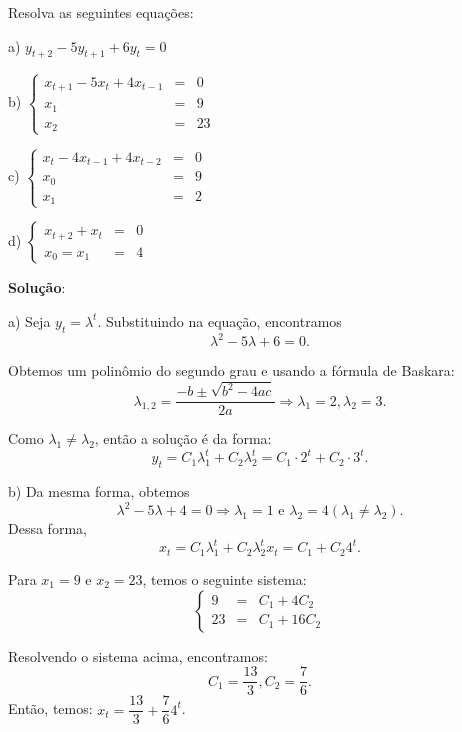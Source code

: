 \begin{exercise}
Resolva as seguintes equações: 

\begin{description}
\item a) $y_{t+2} - 5y_{t+1} + 6y_{t} = 0$
\item b)
$\left\{\begin{array}{rcl}
x_{t+1} - 5x_{t} + 4x_{t-1} &=& 0 \\
x_1 &=& 9 \\
x_2 &=& 23
\end{array}\right.$
\item c)
$\left\{\begin{array}{rcl}
x_{t} - 4x_{t-1} + 4x_{t-2} &=& 0 \\
x_0 &=& 9 \\
x_1 &=& 2 
\end{array}\right.$
\item d) 
$\left\{\begin{array}{rcl}
x_{t+2} + x_{t} &=& 0 \\
x_0 = x_1 &=& 4
\end{array}\right.$

\end{description}
\end{exercise}



\textbf{Solução}:

a) Seja $y_{t} = \lambda^{t}$. Substituindo na equação, encontramos
$$\lambda^{2}-5\lambda +6=0.$$

Obtemos um polinômio do segundo grau e usando a fórmula de Baskara: 
$$\lambda_{1,2} = \dfrac{-b \pm \sqrt{b^2-4ac}}{2a} \Rightarrow \lambda_{1} = 2, \lambda_{2} = 3.$$

Como $\lambda_{1} \ne \lambda_{2}$, então a solução é da forma:
$$y_{t} = C_1\lambda_{1}^{t} + C_2\lambda_{2}^{t} = C_1 \cdot 2^{t} + C_2 \cdot 3^{t}.$$

b) Da mesma forma, obtemos
$$\lambda^{2} - 5\lambda +4=0 \Rightarrow  \lambda_{1} = 1 \mbox{ e } \lambda_{2} = 4 (\lambda_{1} \ne \lambda_{2}).$$
Dessa forma,
$$x_{t} = C_1\lambda_{1}^{t} + C_2\lambda_{2}^{t} x_{t} = C_1 + C_2 4^{t}.$$ 

Para $x_1 = 9$ e $x_2 = 23$, temos o seguinte sistema:
$$\left\{\begin{array}{rcl}
9 &=& C_1 + 4C_2 \\
23 &=& C_1 + 16C_2
\end{array}\right.$$

Resolvendo o sistema acima, encontramos:
$$C_1 = \dfrac{13}{3}, C_2 = \dfrac{7}{6}.$$
Então, temos: $x_{t} = \dfrac{13}{3} + \dfrac{7}{6} 4^{t}$.


